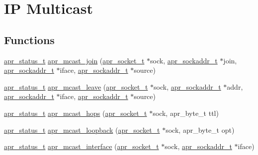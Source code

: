 \hypertarget{group__apr__mcast}{}\section{IP Multicast}
\label{group__apr__mcast}
\subsection*{Functions}
\begin{DoxyCompactItemize}
\item 
\hyperlink{group__apr__errno_gaf76ee4543247e9fb3f3546203e590a6c}{apr\+\_\+status\+\_\+t} \hyperlink{group__apr__mcast_ga731894962f9b20b2ee3ccd057053ef71}{apr\+\_\+mcast\+\_\+join} (\hyperlink{group__apr__network__io_ga49262b223e7434746e1f1737659aa2c3}{apr\+\_\+socket\+\_\+t} $\ast$sock, \hyperlink{structapr__sockaddr__t}{apr\+\_\+sockaddr\+\_\+t} $\ast$join, \hyperlink{structapr__sockaddr__t}{apr\+\_\+sockaddr\+\_\+t} $\ast$iface, \hyperlink{structapr__sockaddr__t}{apr\+\_\+sockaddr\+\_\+t} $\ast$source)
\item 
\hyperlink{group__apr__errno_gaf76ee4543247e9fb3f3546203e590a6c}{apr\+\_\+status\+\_\+t} \hyperlink{group__apr__mcast_gadd3d59b5f628786093277b962c863d13}{apr\+\_\+mcast\+\_\+leave} (\hyperlink{group__apr__network__io_ga49262b223e7434746e1f1737659aa2c3}{apr\+\_\+socket\+\_\+t} $\ast$sock, \hyperlink{structapr__sockaddr__t}{apr\+\_\+sockaddr\+\_\+t} $\ast$addr, \hyperlink{structapr__sockaddr__t}{apr\+\_\+sockaddr\+\_\+t} $\ast$iface, \hyperlink{structapr__sockaddr__t}{apr\+\_\+sockaddr\+\_\+t} $\ast$source)
\item 
\hyperlink{group__apr__errno_gaf76ee4543247e9fb3f3546203e590a6c}{apr\+\_\+status\+\_\+t} \hyperlink{group__apr__mcast_ga373041d43cb0fd05b2974b9fef0ae30f}{apr\+\_\+mcast\+\_\+hops} (\hyperlink{group__apr__network__io_ga49262b223e7434746e1f1737659aa2c3}{apr\+\_\+socket\+\_\+t} $\ast$sock, apr\+\_\+byte\+\_\+t ttl)
\item 
\hyperlink{group__apr__errno_gaf76ee4543247e9fb3f3546203e590a6c}{apr\+\_\+status\+\_\+t} \hyperlink{group__apr__mcast_ga84bc14970499f79de8b71d77898f68ee}{apr\+\_\+mcast\+\_\+loopback} (\hyperlink{group__apr__network__io_ga49262b223e7434746e1f1737659aa2c3}{apr\+\_\+socket\+\_\+t} $\ast$sock, apr\+\_\+byte\+\_\+t opt)
\item 
\hyperlink{group__apr__errno_gaf76ee4543247e9fb3f3546203e590a6c}{apr\+\_\+status\+\_\+t} \hyperlink{group__apr__mcast_ga9949eb40d8bfb670f9bce997cebcdcae}{apr\+\_\+mcast\+\_\+interface} (\hyperlink{group__apr__network__io_ga49262b223e7434746e1f1737659aa2c3}{apr\+\_\+socket\+\_\+t} $\ast$sock, \hyperlink{structapr__sockaddr__t}{apr\+\_\+sockaddr\+\_\+t} $\ast$iface)
\end{DoxyCompactItemize}


